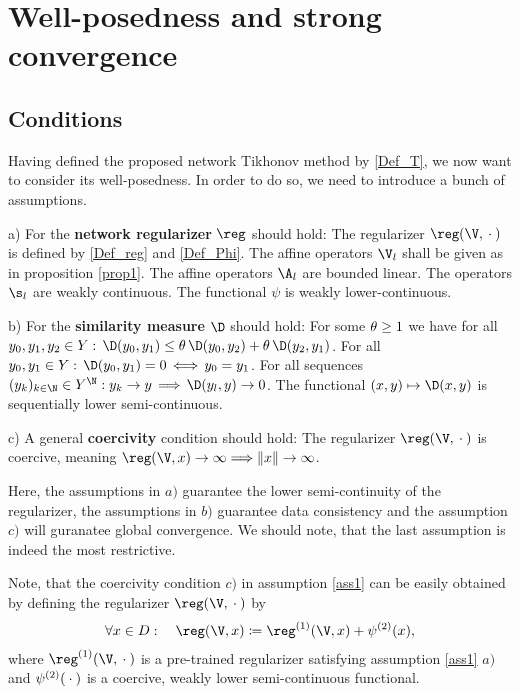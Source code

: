 \justifying
\chapter{Well-posedness and strong convergence}

\section{Conditions}

Having defined the proposed network Tikhonov method by \eqref{Def_T}, we now want to consider its well-posedness. In order to do so, we need to introduce a bunch of assumptions.

\begin{assumption}\label{ass1}
\begin{outline}
\item[a)] For the \textbf{network regularizer} $\reg$ should hold:
\subitem The regularizer $\reg(\V,\wc)$ is defined by \eqref{Def_reg} and \eqref{Def_Phi}.
\subitem The affine operators $\V_l$ shall be given as in proposition \ref{prop1}.
\subitem The affine operators $\A_l$ are bounded linear.
\subitem The operators $\s_l$ are weakly continuous.
\subitem The functional $\psi$ is weakly lower-continuous.
\item[b)] For the \textbf{similarity measure} $\D$ should hold:
\subitem For some $\operatorname{\theta} \geq 1$ we have for all $ y_0,y_1,y_2 \in Y:\, \D(y_0,y_1)\leq \t\D(y_0,y_2) + \t\D(y_2,y_1)$.
\subitem For all $y_0,y_1 \in Y:\, \D(y_0,y_1) = 0 \,\Longleftrightarrow \, y_0=y_1$.
\subitem For all sequences $(y_k)_{k \in \N} \in Y^{\N} : y_k \to y \,\Longrightarrow \,\D(y_l,y) \to 0$.
\subitem The functional $(x,y) \mapsto \D(x,y)$ is sequentially lower semi-continuous.
\item[c)] A general \textbf{coercivity} condition should hold:
\subitem The regularizer $\reg(\V,\wc)$ is coercive, meaning $\reg(\V,x) \to \infty \Longrightarrow \|x\| \to \infty $.
\end{outline}

Here, the assumptions in $a)$ guarantee the lower semi-continuity of the regularizer, the assumptions in $b)$ guarantee data consistency and the assumption $c)$ will guranatee global convergence. We should note, that the last assumption is indeed the most restrictive.
\end{assumption}

\begin{remark}
Note, that the coercivity condition $c)$ in assumption \ref{ass1} can be easily obtained by defining the regularizer $\reg(\V,\wc)$ by
\begin{align*}
\forall x \in D: \quad \reg(\V,x) \coloneqq \reg^{(1)}(\V,x) + \psi^{(2)}(x),
\end{align*}
where $\reg^{(1)}(\V,\wc)$ is a pre-trained regularizer satisfying assumption \ref{ass1} $a)$ and $\psi^{(2)}({}\cdot{})$ is a coercive, weakly lower semi-continuous functional.
\end{remark}

